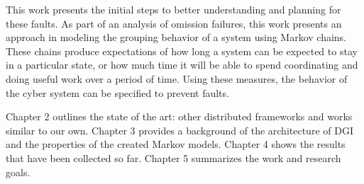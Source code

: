 This work presents the initial steps to better understanding and planning for these faults.
As part of an analysis of omission failures, this work presents an approach in modeling the grouping behavior of a system using Markov chains.
These chains produce expectations of how long a system can be expected to stay in a particular state, or how much time it will be able to spend coordinating and doing useful work over a period of time.
Using these measures, the behavior of the cyber system can be specified to prevent faults.

Chapter 2 outlines the state of the art: other distributed frameworks and works similar to our own.
Chapter 3 provides a background of the architecture of DGI and the properties of the created Markov models.
Chapter 4 shows the results that have been collected so far.
Chapter 5 summarizes the work and research goals.
